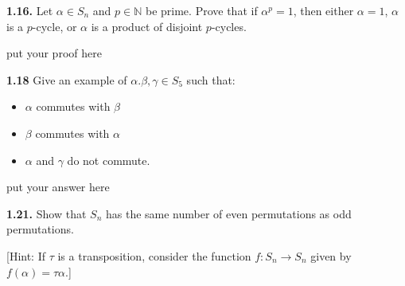 \documentclass[12pt]{article}
\begin{document}
\textbf{1.16.} Let $\alpha\in S_n$ and $p\in \mathbb{N}$ be prime. Prove that if $\alpha^p=1$, then either $\alpha=1$, $\alpha$ is a $p$-cycle, or $\alpha$ is a product of disjoint $p$-cycles.

	\bigskip

	put your proof here

	\vspace{1in}

\textbf{1.18} Give an example of $\alpha. \beta, \gamma\in S_5$ such that:
\begin{itemize}
	\item $\alpha$ commutes with $\beta$
	\item $\beta$ commutes with $\alpha$
	\item $\alpha$ and $\gamma$ do not commute.
\end{itemize}

\bigskip

	put your answer here

	\vspace{1in}

\textbf{1.21.} Show that $S_n$ has the same number of even permutations as odd permutations.

[Hint: If $\tau$ is a transposition, consider the function $f : S_n\to S_n$ given by $f(\alpha)=\tau\alpha$.]
\end{document}
